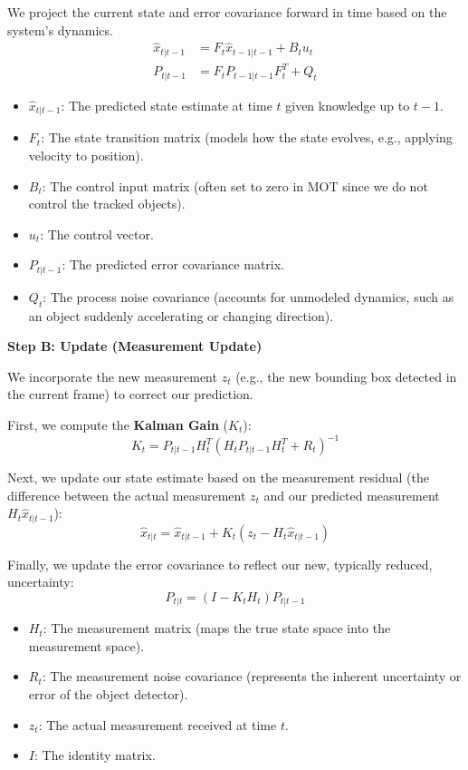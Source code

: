 \documentclass[10pt,twocolumn,letterpaper]{article}
\begin{document}
We project the current state and error covariance forward in time based on the system's dynamics.
\begin{align}
    \hat{x}_{t|t-1} &= F_t \hat{x}_{t-1|t-1} + B_t u_t \\
    P_{t|t-1} &= F_t P_{t-1|t-1} F_t^T + Q_t
\end{align}
\begin{itemize}
    \item $\hat{x}_{t|t-1}$: The predicted state estimate at time $t$ given knowledge up to $t-1$.
    \item $F_t$: The state transition matrix (models how the state evolves, e.g., applying velocity to position).
    \item $B_t$: The control input matrix (often set to zero in MOT since we do not control the tracked objects).
    \item $u_t$: The control vector.
    \item $P_{t|t-1}$: The predicted error covariance matrix.
    \item $Q_t$: The process noise covariance (accounts for unmodeled dynamics, such as an object suddenly accelerating or changing direction).
\end{itemize}

\noindent\textbf{Step B: Update (Measurement Update)}

We incorporate the new measurement $z_t$ (e.g., the new bounding box detected in the current frame) to correct our prediction.

First, we compute the \textbf{Kalman Gain} ($K_t$):
\begin{equation}
    K_t = P_{t|t-1} H_t^T (H_t P_{t|t-1} H_t^T + R_t)^{-1}
\end{equation}

Next, we update our state estimate based on the measurement residual (the difference between the actual measurement $z_t$ and our predicted measurement $H_t \hat{x}_{t|t-1}$):
\begin{equation}
    \hat{x}_{t|t} = \hat{x}_{t|t-1} + K_t (z_t - H_t \hat{x}_{t|t-1})
\end{equation}

Finally, we update the error covariance to reflect our new, typically reduced, uncertainty:
\begin{equation}
    P_{t|t} = (I - K_t H_t) P_{t|t-1}
\end{equation}

\begin{itemize}
    \item $H_t$: The measurement matrix (maps the true state space into the measurement space).
    \item $R_t$: The measurement noise covariance (represents the inherent uncertainty or error of the object detector).
    \item $z_t$: The actual measurement received at time $t$.
    \item $I$: The identity matrix.
\end{itemize}
\end{document}
